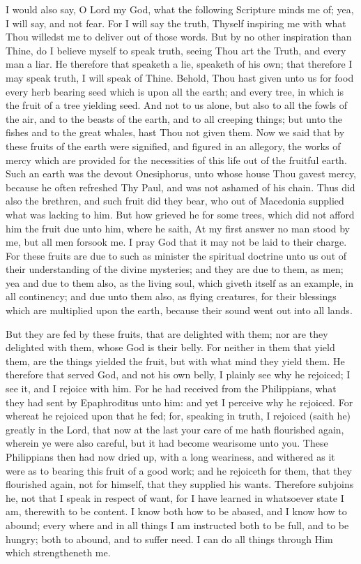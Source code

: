 \documentclass[b5paper,openright,12pt,twoside]{book}
\begin{document}
I would also say, O Lord my God, what the following Scripture minds me
of; yea, I will say, and not fear. For I will say the truth, Thyself
inspiring me with what Thou willedst me to deliver out of those words.
But by no other inspiration than Thine, do I believe myself to speak
truth, seeing Thou art the Truth, and every man a liar. He therefore
that speaketh a lie, speaketh of his own; that therefore I may speak
truth, I will speak of Thine. Behold, Thou hast given unto us for food
every herb bearing seed which is upon all the earth; and every tree,
in which is the fruit of a tree yielding seed. And not to us alone, but
also to all the fowls of the air, and to the beasts of the earth, and to
all creeping things; but unto the fishes and to the great whales, hast
Thou not given them. Now we said that by these fruits of the earth were
signified, and figured in an allegory, the works of mercy which are
provided for the necessities of this life out of the fruitful earth.
Such an earth was the devout Onesiphorus, unto whose house Thou gavest
mercy, because he often refreshed Thy Paul, and was not ashamed of his
chain. Thus did also the brethren, and such fruit did they bear, who out
of Macedonia supplied what was lacking to him. But how grieved he for
some trees, which did not afford him the fruit due unto him, where he
saith, At my first answer no man stood by me, but all men forsook me. I
pray God that it may not be laid to their charge. For these fruits are
due to such as minister the spiritual doctrine unto us out of their
understanding of the divine mysteries; and they are due to them, as men;
yea and due to them also, as the living soul, which giveth itself as an
example, in all continency; and due unto them also, as flying creatures,
for their blessings which are multiplied upon the earth, because their
sound went out into all lands.

But they are fed by these fruits, that are delighted with them; nor are
they delighted with them, whose God is their belly. For neither in them
that yield them, are the things yielded the fruit, but with what mind
they yield them. He therefore that served God, and not his own belly,
I plainly see why he rejoiced; I see it, and I rejoice with him. For he
had received from the Philippians, what they had sent by Epaphroditus
unto him: and yet I perceive why he rejoiced. For whereat he rejoiced
upon that he fed; for, speaking in truth, I rejoiced (saith he) greatly
in the Lord, that now at the last your care of me hath flourished again,
wherein ye were also careful, but it had become wearisome unto you.
These Philippians then had now dried up, with a long weariness, and
withered as it were as to bearing this fruit of a good work; and he
rejoiceth for them, that they flourished again, not for himself, that
they supplied his wants. Therefore subjoins he, not that I speak in
respect of want, for I have learned in whatsoever state I am, therewith
to be content. I know both how to be abased, and I know how to abound;
every where and in all things I am instructed both to be full, and to be
hungry; both to abound, and to suffer need. I can do all things through
Him which strengtheneth me.
\end{document}
